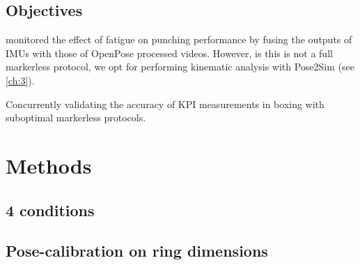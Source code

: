 



\subsection{Objectives}

\cite{Haralabidis2020} monitored the effect of fatigue on punching performance by fusing the outputs of IMUs with those of OpenPose processed videos. However, is this is not a full markerless protocol, we opt for performing kinematic analysis with Pose2Sim \cite{Pagnon2022b} (see \autoref{ch:3}).

Concurrently validating the accuracy of KPI measurements in boxing with suboptimal markerless protocols.


\section{Methods}
\subsection{4 conditions}
\blindtext

\subsection{Pose-calibration on ring dimensions}
\blindtext


